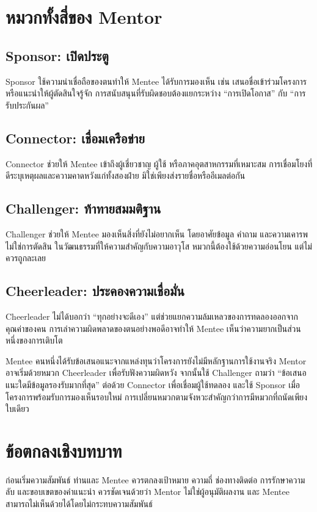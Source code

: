 \section{หมวกทั้งสี่ของ Mentor}
\subsection{Sponsor: เปิดประตู}
Sponsor ใช้ความน่าเชื่อถือของตนทำให้ Mentee ได้รับการมองเห็น เช่น เสนอชื่อเข้าร่วมโครงการ หรือแนะนำให้ผู้ตัดสินใจรู้จัก การสนับสนุนที่รับผิดชอบต้องแยกระหว่าง \enquote{การเปิดโอกาส} กับ \enquote{การรับประกันผล}

\subsection{Connector: เชื่อมเครือข่าย}
Connector ช่วยให้ Mentee เข้าถึงผู้เชี่ยวชาญ ผู้ใช้ หรือภาคอุตสาหกรรมที่เหมาะสม การเชื่อมโยงที่ดีระบุเหตุผลและความคาดหวังแก่ทั้งสองฝ่าย มิใช่เพียงส่งรายชื่อหรืออีเมลต่อกัน

\subsection{Challenger: ท้าทายสมมติฐาน}
Challenger ช่วยให้ Mentee มองเห็นสิ่งที่ยังไม่อยากเห็น โดยอาศัยข้อมูล คำถาม และความเคารพ ไม่ใช่การตัดสิน ในวัฒนธรรมที่ให้ความสำคัญกับความอาวุโส หมวกนี้ต้องใช้ด้วยความอ่อนโยน แต่ไม่ควรถูกละเลย

\subsection{Cheerleader: ประคองความเชื่อมั่น}
Cheerleader ไม่ได้บอกว่า \enquote{ทุกอย่างจะดีเอง} แต่ช่วยแยกความล้มเหลวของการทดลองออกจากคุณค่าของคน การเล่าความผิดพลาดของตนอย่างพอดีอาจทำให้ Mentee เห็นว่าความยากเป็นส่วนหนึ่งของการเติบโต

\begin{examplebox}
Mentee คนหนึ่งได้รับข้อเสนอแนะจากแหล่งทุนว่าโครงการยังไม่มีหลักฐานการใช้งานจริง Mentor อาจเริ่มด้วยหมวก Cheerleader เพื่อรับฟังความผิดหวัง จากนั้นใช้ Challenger ถามว่า \enquote{ข้อเสนอแนะใดมีข้อมูลรองรับมากที่สุด} ต่อด้วย Connector เพื่อเชื่อมผู้ใช้ทดลอง และใช้ Sponsor เมื่อโครงการพร้อมรับการมองเห็นรอบใหม่ การเปลี่ยนหมวกตามจังหวะสำคัญกว่าการมีหมวกที่ถนัดเพียงใบเดียว
\end{examplebox}

\section{ข้อตกลงเชิงบทบาท}
ก่อนเริ่มความสัมพันธ์ ท่านและ Mentee ควรตกลงเป้าหมาย ความถี่ ช่องทางติดต่อ การรักษาความลับ และขอบเขตของคำแนะนำ ควรชัดเจนด้วยว่า Mentor ไม่ใช่ผู้อนุมัติผลงาน และ Mentee สามารถไม่เห็นด้วยได้โดยไม่กระทบความสัมพันธ์

